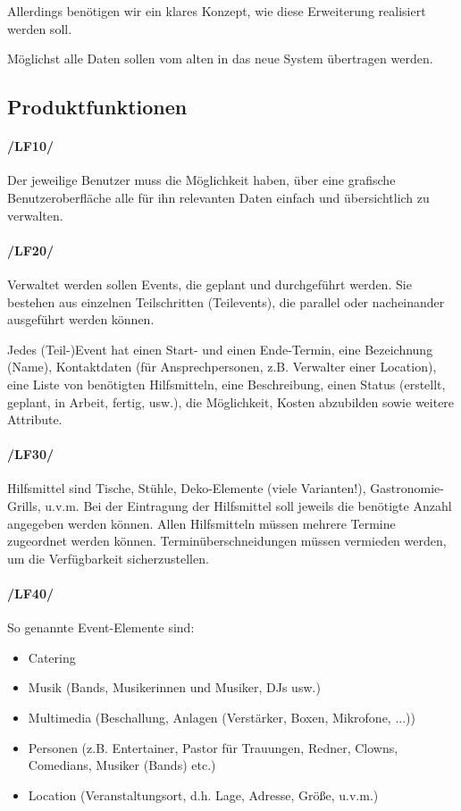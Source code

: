 Allerdings benötigen wir ein klares Konzept, wie diese Erweiterung realisiert werden soll. 

Möglichst alle Daten sollen vom alten in das neue System übertragen werden.
\subsection{Produktfunktionen}
\paragraph{/LF10/}
Der jeweilige Benutzer muss die Möglichkeit haben, über eine grafische Benutzeroberfläche alle für ihn relevanten Daten einfach und übersichtlich zu verwalten.
\paragraph{/LF20/}
Verwaltet werden sollen Events, die geplant und durchgeführt werden. Sie bestehen aus einzelnen Teilschritten (Teilevents), die parallel oder nacheinander ausgeführt werden können.

Jedes (Teil-)Event hat einen Start- und einen Ende-Termin, eine Bezeichnung (Name), Kontaktdaten (für Ansprechpersonen, z.B. Verwalter einer Location), eine Liste von benötigten Hilfsmitteln, eine Beschreibung, einen Status (erstellt, geplant, in Arbeit, fertig, usw.), die Möglichkeit, Kosten abzubilden sowie weitere Attribute.
\paragraph{/LF30/}
Hilfsmittel sind Tische, Stühle, Deko-Elemente (viele Varianten!), Gastronomie-Grills, u.v.m. Bei der Eintragung der Hilfsmittel soll jeweils die benötigte Anzahl angegeben werden können. Allen Hilfsmitteln müssen mehrere Termine zugeordnet werden können. Terminüberschneidungen müssen vermieden werden, um die Verfügbarkeit sicherzustellen.
\paragraph{/LF40/}
So genannte Event-Elemente sind:
\begin{itemize}
    \item Catering
    \item Musik (Bands, Musikerinnen und Musiker, DJs usw.)
    \item Multimedia (Beschallung, Anlagen (Verstärker, Boxen, Mikrofone, ...)) 
    \item Personen (z.B. Entertainer, Pastor für Trauungen, Redner, Clowns, Comedians, Musiker (Bands) etc.)
    \item Location (Veranstaltungsort, d.h. Lage, Adresse, Größe, u.v.m.)
\end{itemize}

